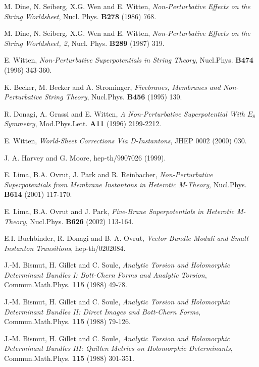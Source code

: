 \documentclass[a4paper,12pt]{article}
\numberwithin{equation}{section}
\theoremstyle{plain}
\begin{document}
\begin{thebibliography}{99}


 M. Dine, N. Seiberg, X.G. Wen and E. Witten, {\em
Non-Perturbative Effects on the String Worldsheet}, Nucl. Phys. {\bf B278}
(1986) 768.

 M. Dine, N. Seiberg, X.G. Wen and E. Witten, {\em
Non-Perturbative Effects on the String Worldsheet, 2}, Nucl. Phys. {\bf
B289}
(1987) 319.

 E. Witten, {\em Non-Perturbative Superpotentials in
String
Theory}, Nucl.Phys. {\bf B474} (1996) 343-360.

  K. Becker, M. Becker and A. Strominger, {\em
Fivebranes, Membranes and Non-Perturbative String Theory},
Nucl.Phys. {\bf B456} (1995) 130.

 R. Donagi, A. Grassi and E. Witten, {\em A Non-Perturbative
Superpotential With $E_8$ Symmetry}, Mod.Phys.Lett. {\bf A11} (1996)
2199-2212.

 E. Witten, {\em World-Sheet Corrections Via
D-Instantons},
JHEP 0002 (2000) 030.

 J. A. Harvey and  G. Moore, hep-th/9907026 (1999).

 E. Lima, B.A. Ovrut, J. Park and R. Reinbacher,
{\em Non-Perturbative Superpotentials from Membrane Instantons in
Heterotic M-Theory}, Nucl.Phys. {\bf B614} (2001) 117-170.

 E. Lima, B.A. Ovrut and J. Park,
{\em  Five-Brane Superpotentials in Heterotic M-Theory},
Nucl.Phys. {\bf B626} (2002) 113-164.

  E.I. Buchbinder, R. Donagi and B. A. Ovrut,
{\em Vector Bundle Moduli and Small Instanton Transitions},
hep-th/0202084.

 J.-M. Bismut, H. Gillet and C. Soule,
{\em Analytic Torsion and Holomorphic Determinant Bundles I: Bott-Chern
Forms and Analytic Torsion}, Commun.Math.Phys. {\bf
115 \rm} (1988) 49-78.

 J.-M. Bismut, H. Gillet and C. Soule,
{\em Analytic Torsion and Holomorphic Determinant Bundles II: Direct Images
and Bott-Chern Forms}, Commun.Math.Phys. {\bf
115 \rm} (1988) 79-126.

 J.-M. Bismut, H. Gillet and C. Soule,
{\em Analytic Torsion and Holomorphic Determinant Bundles III: Quillen Metrics
on Holomorphic Determinants}, Commun.Math.Phys. {\bf
115 \rm} (1988) 301-351.


\end{thebibliography}
\end{document}
